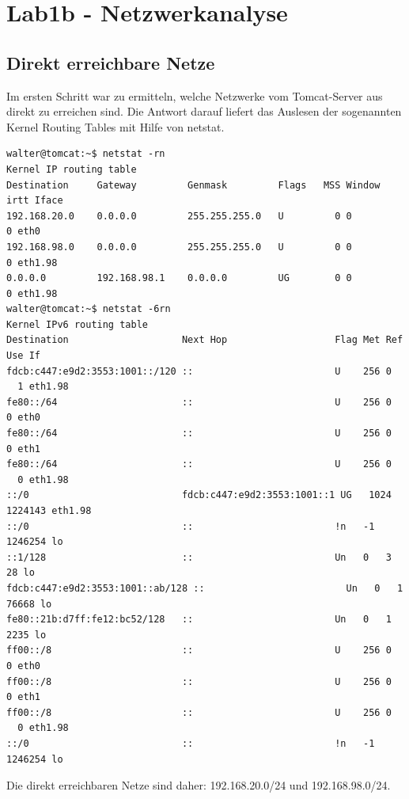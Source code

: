 \section{Lab1b - Netzwerkanalyse}

\subsection{Direkt erreichbare Netze}

Im ersten Schritt war zu ermitteln, welche Netzwerke vom Tomcat-Server aus direkt zu erreichen sind. Die Antwort darauf liefert das Auslesen der sogenannten Kernel Routing Tables mit Hilfe von netstat.

\begin{lstlisting}
walter@tomcat:~$ netstat -rn
Kernel IP routing table
Destination     Gateway         Genmask         Flags   MSS Window  irtt Iface
192.168.20.0    0.0.0.0         255.255.255.0   U         0 0          0 eth0
192.168.98.0    0.0.0.0         255.255.255.0   U         0 0          0 eth1.98
0.0.0.0         192.168.98.1    0.0.0.0         UG        0 0          0 eth1.98
walter@tomcat:~$ netstat -6rn
Kernel IPv6 routing table
Destination                    Next Hop                   Flag Met Ref Use If
fdcb:c447:e9d2:3553:1001::/120 ::                         U    256 0
  1 eth1.98
fe80::/64                      ::                         U    256 0     0 eth0
fe80::/64                      ::                         U    256 0     0 eth1
fe80::/64                      ::                         U    256 0
  0 eth1.98
::/0                           fdcb:c447:e9d2:3553:1001::1 UG   1024
1224143 eth1.98
::/0                           ::                         !n   -1  1246254 lo
::1/128                        ::                         Un   0   3    28 lo
fdcb:c447:e9d2:3553:1001::ab/128 ::                         Un   0   1 76668 lo
fe80::21b:d7ff:fe12:bc52/128   ::                         Un   0   1  2235 lo
ff00::/8                       ::                         U    256 0     0 eth0
ff00::/8                       ::                         U    256 0     0 eth1
ff00::/8                       ::                         U    256 0
  0 eth1.98
::/0                           ::                         !n   -1  1246254 lo
\end{lstlisting}

Die direkt erreichbaren Netze sind daher: 192.168.20.0/24 und 192.168.98.0/24.

